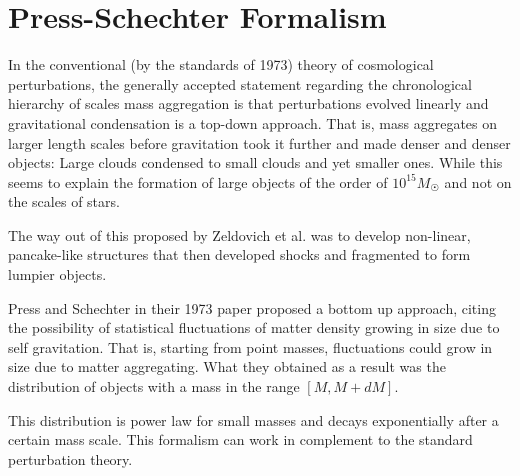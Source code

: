 \documentclass[12pt,a4paper,oneside]{book}
\begin{document}
	\section{Press-Schechter Formalism}
		In the conventional (by the standards of 1973) theory of cosmological perturbations,	the generally accepted statement regarding the chronological hierarchy of scales mass aggregation is that perturbations evolved linearly and gravitational condensation is a top-down approach. That is, mass aggregates on larger length scales before gravitation took it further and made denser and denser objects: Large clouds condensed to small clouds and yet smaller ones. While this seems to explain the formation of large objects of the order of $10^{15}M_\Sun$ and not on the scales of stars.
		
		The way out of this proposed by Zeldovich et al. was to develop non-linear, pancake-like structures that then developed shocks and fragmented to form lumpier objects.
		
		Press and Schechter in their 1973 paper proposed a bottom up approach, citing the possibility of statistical fluctuations of matter density growing in size due to self gravitation. That is, starting from point masses, fluctuations could grow in size due to matter aggregating. What they obtained as a result was the distribution of objects with a mass in the range $[M, M+dM]$. 
		
		This distribution is power law for small masses and decays exponentially after a certain mass scale. This formalism can work in complement to the standard perturbation theory.
\end{document}
